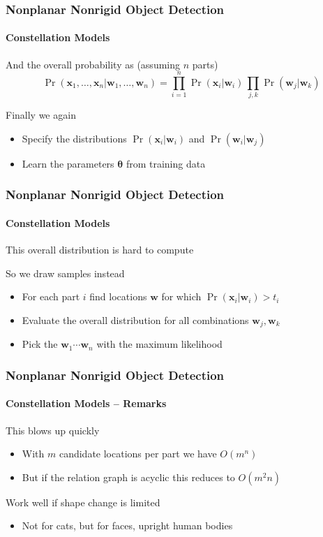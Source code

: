 \documentclass[xetex,professionalfont]{beamer}
\renewcommand{\vec}[1]{\ensuremath{\mathbf{#1}}}
\newcommand{\vw}{\vec{w}}
\newcommand{\vx}{\vec{x}}
\newcommand{\bth}{\boldsymbol{\theta}}
\begin{document}

\begin{frame}
\frametitle{Nonplanar Nonrigid Object Detection}
\framesubtitle{Constellation Models}

And the overall probability as (assuming $n$ parts)
\[
    \Pr(\vx_1,\dots,\vx_n|\vw_1,\dots,\vw_n) = \prod_{i=1}^n \Pr(\vx_i|\vw_i)\, \prod_{j,k}\Pr(\vw_j|\vw_k)
\]

Finally we again
\begin{itemize}
    \item Specify the distributions $\Pr(\vx_i|\vw_i)$ and $\Pr(\vw_i|\vw_j)$ %
    \item Learn the parameters $\bth$ from training data %
\end{itemize}

\end{frame}


\begin{frame}
\frametitle{Nonplanar Nonrigid Object Detection}
\framesubtitle{Constellation Models}

This overall distribution is hard to compute

\bigskip
So we draw samples instead
\begin{itemize}
    \item For each part $i$ find locations $\vw$ for which $\Pr(\vx_i|\vw_i)>t_i$
    \item Evaluate the overall distribution for all combinations $\vw_j,\vw_k$
    \item Pick the $\vw_1\cdots\vw_n$ with the maximum likelihood %
\end{itemize}

\end{frame}


\begin{frame}
\frametitle{Nonplanar Nonrigid Object Detection}
\framesubtitle{Constellation Models -- Remarks}

This blows up quickly
\begin{itemize}
    \item With $m$ candidate locations per part we have $O(m^n)$
    \item But if the relation graph is acyclic this reduces to $O(m^2n)$
\end{itemize}

\bigskip
Work well if shape change is limited
\begin{itemize}
    \item Not for cats, but for faces, upright human bodies
\end{itemize}

\end{frame}
\end{document}
